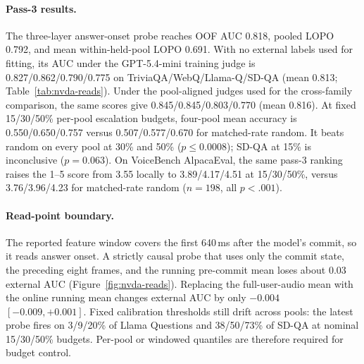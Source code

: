 \paragraph{Pass-3 results.}
The three-layer answer-onset probe reaches OOF AUC 0.818, pooled LOPO
0.792, and mean within-held-pool LOPO 0.691. With no external labels
used for fitting, its AUC under the GPT-5.4-mini training judge is
0.827/0.862/0.790/0.775 on TriviaQA/WebQ/Llama-Q/SD-QA (mean 0.813;
Table~\ref{tab:nvda-reads}). Under the pool-aligned judges used for
the cross-family comparison, the same scores give
0.845/0.845/0.803/0.770 (mean 0.816). At fixed 15/30/50\% per-pool
escalation budgets, four-pool mean accuracy is 0.550/0.650/0.757
versus 0.507/0.577/0.670 for matched-rate random. It beats random on
every pool at 30\% and 50\% ($p\le0.0008$); SD-QA at 15\% is
inconclusive ($p{=}0.063$). On VoiceBench AlpacaEval, the same pass-3
ranking raises the 1--5 score from 3.55 locally to 3.89/4.17/4.51 at
15/30/50\%, versus 3.76/3.96/4.23 for matched-rate random
($n{=}198$, all $p<.001$).

\paragraph{Read-point boundary.}
The reported feature window covers the first 640\,ms after the model's
commit, so it reads answer onset. A strictly causal probe that uses
only the commit state, the preceding eight frames, and the running
pre-commit mean loses about 0.03 external AUC
(Figure~\ref{fig:nvda-reads}). Replacing the full-user-audio mean
with the online running mean changes external AUC by only
$-0.004$ $[-0.009,+0.001]$. Fixed calibration thresholds still drift
across pools: the latest probe fires on 3/9/20\% of Llama Questions
and 38/50/73\% of SD-QA at nominal 15/30/50\% budgets. Per-pool or
windowed quantiles are therefore required for budget control.

